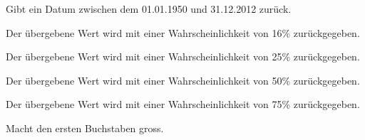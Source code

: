 \documentclass[a4paper,12pt,oneside]{sphinxmanual}
\begin{document}

\begin{fulllineitems}
\label{funktionen:pyzufall.datum}
Gibt ein Datum zwischen dem 01.01.1950 und 31.12.2012 zurück.

\end{fulllineitems}


\begin{fulllineitems}
\label{funktionen:pyzufall.e16}
Der übergebene Wert wird mit einer Wahrscheinlichkeit von 16\% zurückgegeben.

\end{fulllineitems}


\begin{fulllineitems}
\label{funktionen:pyzufall.e25}
Der übergebene Wert wird mit einer Wahrscheinlichkeit von 25\% zurückgegeben.

\end{fulllineitems}


\begin{fulllineitems}
\label{funktionen:pyzufall.e50}
Der übergebene Wert wird mit einer Wahrscheinlichkeit von 50\% zurückgegeben.

\end{fulllineitems}


\begin{fulllineitems}
\label{funktionen:pyzufall.e75}
Der übergebene Wert wird mit einer Wahrscheinlichkeit von 75\% zurückgegeben.

\end{fulllineitems}


\begin{fulllineitems}
\label{funktionen:pyzufall.erste_gross}
Macht den ersten Buchstaben gross.

\end{fulllineitems}
\end{document}
